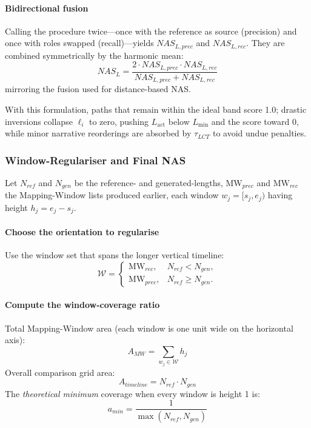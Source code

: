 \documentclass[main.tex]{subfiles}
\begin{document}
\paragraph{Bidirectional fusion}
Calling the procedure twice—once with the reference as source (precision) and once with roles swapped (recall)—yields $NAS_{L,prec}$ and $NAS_{L,rec}$. They are combined symmetrically by the harmonic mean:
\begin{equation}
NAS_L = \frac{2 \cdot NAS_{L,prec} \cdot NAS_{L,rec}}{NAS_{L,prec} + NAS_{L,rec}}
\end{equation}
mirroring the fusion used for distance-based NAS.

With this formulation, paths that remain within the ideal band score 1.0; drastic inversions collapse $\ell_i$ to zero, pushing $L_{\text{act}}$ below $L_{\min}$ and the score toward 0, while minor narrative reorderings are absorbed by $\tau_{LCT}$ to avoid undue penalties.

\subsubsection{Window-Regulariser and Final NAS}
Let $N_{ref}$ and $N_{gen}$ be the reference- and generated-lengths, $\text{MW}_{prec}$ and $\text{MW}_{rec}$ the Mapping-Window lists produced earlier, each window $w_j = [s_j, e_j)$ having height $h_j = e_j - s_j$.

\paragraph{Choose the orientation to regularise}
Use the window set that spans the longer vertical timeline:
\begin{equation}
\mathcal{W} = \begin{cases} 
\text{MW}_{rec}, & N_{ref} < N_{gen}, \\
\text{MW}_{prec}, & N_{ref} \geq N_{gen}.
\end{cases}
\end{equation}

\paragraph{Compute the window-coverage ratio}
Total Mapping-Window area (each window is one unit wide on the horizontal axis):
\begin{equation}
A_{MW} = \sum_{w_j \in \mathcal{W}} h_j
\end{equation}
Overall comparison grid area:
\begin{equation}
A_{timeline} = N_{ref} \cdot N_{gen}
\end{equation}
The \textit{theoretical minimum} coverage when every window is height 1 is:
\begin{equation}
a_{min} = \frac{1}{\max(N_{ref}, N_{gen})}
\end{equation}
\end{document}
